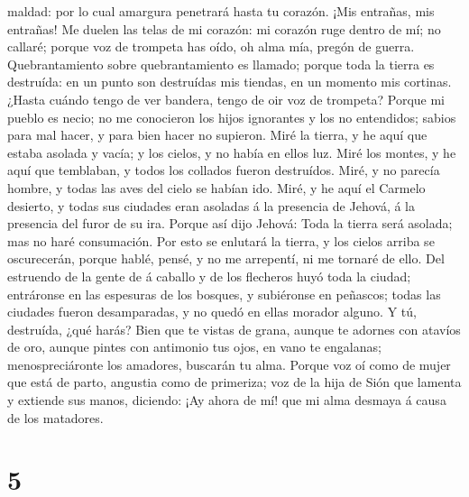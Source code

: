 maldad: por lo cual amargura penetrará hasta tu corazón. 
¡Mis entrañas, mis entrañas! Me duelen las telas de mi corazón: mi
corazón ruge dentro de mí; no callaré; porque voz de trompeta has oído,
oh alma mía, pregón de guerra.  Quebrantamiento sobre
quebrantamiento es llamado; porque toda la tierra es destruída: en un
punto son destruídas mis tiendas, en un momento mis cortinas.
 ¿Hasta cuándo tengo de ver bandera, tengo de oir voz de
trompeta?  Porque mi pueblo es necio; no me conocieron los
hijos ignorantes y los no entendidos; sabios para mal hacer, y para bien
hacer no supieron.  Miré la tierra, y he aquí que estaba
asolada y vacía; y los cielos, y no había en ellos luz. 
Miré los montes, y he aquí que temblaban, y todos los collados fueron
destruídos.  Miré, y no parecía hombre, y todas las aves
del cielo se habían ido.  Miré, y he aquí el Carmelo
desierto, y todas sus ciudades eran asoladas á la presencia de Jehová, á
la presencia del furor de su ira.  Porque así dijo Jehová:
Toda la tierra será asolada; mas no haré consumación.  Por
esto se enlutará la tierra, y los cielos arriba se oscurecerán, porque
hablé, pensé, y no me arrepentí, ni me tornaré de ello. 
Del estruendo de la gente de á caballo y de los flecheros huyó toda la
ciudad; entráronse en las espesuras de los bosques, y subiéronse en
peñascos; todas las ciudades fueron desamparadas, y no quedó en ellas
morador alguno.  Y tú, destruída, ¿qué harás? Bien que te
vistas de grana, aunque te adornes con atavíos de oro, aunque pintes con
antimonio tus ojos, en vano te engalanas; menospreciáronte los amadores,
buscarán tu alma.  Porque voz oí como de mujer que está de
parto, angustia como de primeriza; voz de la hija de Sión que lamenta y
extiende sus manos, diciendo: ¡Ay ahora de mí! que mi alma desmaya á
causa de los matadores.

\hypertarget{section-4}{%
\section{5}\label{section-4}}

